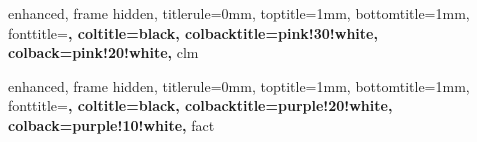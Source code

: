 
{
    enhanced,
    frame hidden,
    titlerule=0mm,
    toptitle=1mm,
    bottomtitle=1mm,
    fonttitle=\bfseries\large,
    coltitle=black,
    colbacktitle=pink!30!white,
    colback=pink!20!white,
}{clm}



\newenvironment{clmpf}{
	{\noindent{\it \textbf{Demostración}}}
	\tcolorbox[blanker,breakable,left=5mm,parbox=false,
    before upper={\parindent15pt},
    after skip=10pt,
	borderline west={1mm}{0pt}{pink!30!white}]
}{
    \textcolor{pink!30!white}{\hbox{}\nobreak\hfill$\blacksquare$} 
    \endtcolorbox
}

\NewDocumentCommand{\clmp}{m+m+m}{
    \begin{myclaim*}{#1}{}
        #2
    \end{myclaim*}

    \begin{clmpf}
        #3
    \end{clmpf}
}

{
    enhanced,
    frame hidden,
    titlerule=0mm,
    toptitle=1mm,
    bottomtitle=1mm,
    fonttitle=\bfseries\large,
    coltitle=black,
    colbacktitle=purple!20!white,
    colback=purple!10!white,
}{fact}




\newenvironment{example}{%
    \par
    \vspace{5pt}
	\begin{minipage}{\textwidth}
		\noindent\textbf{Ejemplo}
		\tcolorbox[blanker,breakable,left=5mm,parbox=false,
	    before upper={\parindent15pt},
	    after skip=10pt,
		borderline west={1mm}{0pt}{cyan!10!white}]
}{
		\endtcolorbox
	\end{minipage}
    \vspace{5pt}
}

